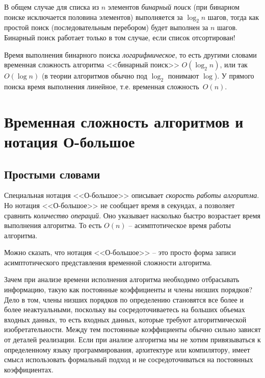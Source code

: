 \documentclass[%
	11pt,
	a4paper,
	utf8,
		]{article}
\begin{document}
В общем случае для списка из $ n $ элементов \emph{бинарный поиск} (при бинарном поиске исключается половина элементов) выполняется за $ \log_2 n $ шагов, тогда как простой поиск (последовательным перебором) будет выполнен за $ n $ шагов. Бинарный поиск работает только в том случае, если список отсортирован!

Время выполнения бинарного поиска \emph{логарифмическое}, то есть другими словами временная сложность алгоритма <<бинарный поиск>> $ O(\log_2 n) $, или так $ O(\log n) $ (в теории алгоритмов обычно под $ \log_2 $ понимают $ \log $). У прямого поиска время выполнения линейное, т.е. временная сложность~$ O(n) $.

\section{Временная сложность алгоритмов и нотация О-большое}

\subsection{Простыми словами}

Специальная нотация <<О-большое>> описывает \emph{скорость работы алгоритма}. Но нотация <<О-большое>> не сообщает время в секундах, а позволяет сравнить \emph{количество операций}. Оно указывает насколько быстро возрастает время выполнения алгоритма. То есть $ O(n) $ -- асимптотическое время работы алгоритма.

Можно сказать, что нотация <<О-большое>> -- это просто форма записи асимптотического представления временной сложности алгоритма.


Зачем при анализе времени исполнения алгоритма необходимо отбрасывать информацию, такую как постоянные коэффициенты и члены низших порядков? Дело в том, члены низших порядков по определению становятся все более и более неактуальными, поскольку вы сосредоточиваетесь на больших объемах входных данных, то есть входных данных, которые требуют алгоритмической изобретательности. Между тем постоянные коэффициенты обычно сильно зависят от деталей реализации. Если при анализе алгоритма мы не хотим привязываться к определенному языку программирования, архитектуре или компилятору, имеет смысл использовать формальный подход и не сосредоточиваться на постоянных коэффициентах.
\end{document}
